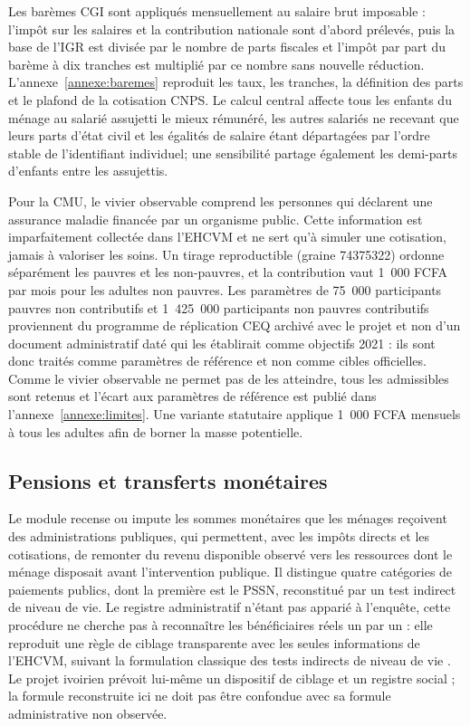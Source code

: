 \documentclass[11pt,a4paper]{article}
\begin{document}
Les barèmes CGI sont appliqués mensuellement au salaire brut imposable : l'impôt
sur les salaires et la contribution nationale sont d'abord prélevés, puis la
base de l'IGR est divisée par le nombre de parts fiscales et l'impôt par part du
barème à dix tranches est multiplié par ce nombre sans nouvelle réduction.
L'annexe~\ref{annexe:baremes} reproduit les taux, les tranches, la définition
des parts et le plafond de la cotisation CNPS. Le calcul central affecte tous
les enfants du ménage au salarié assujetti le mieux rémunéré, les autres
salariés ne recevant que leurs parts d'état civil et les égalités de salaire
étant départagées par l'ordre stable de l'identifiant individuel; une
sensibilité partage également les demi-parts d'enfants entre les assujettis.

Pour la CMU, le vivier observable comprend les personnes qui déclarent une
assurance maladie financée par un organisme public. Cette information est
imparfaitement collectée dans l'EHCVM et ne sert qu'à simuler une cotisation,
jamais à valoriser les soins. Un tirage reproductible (graine 74375322) ordonne
séparément les pauvres et les non-pauvres, et la contribution vaut 1~000 FCFA
par mois pour les adultes non pauvres. Les paramètres de 75~000 participants
pauvres non contributifs et 1~425~000 participants non pauvres contributifs
proviennent du programme de réplication CEQ archivé avec le projet et non d'un
document administratif daté qui les établirait comme objectifs 2021 : ils sont
donc traités comme paramètres de référence et non comme cibles officielles.
Comme le vivier observable ne permet pas de les atteindre, tous les admissibles
sont retenus et l'écart aux paramètres de référence est publié dans
l'annexe~\ref{annexe:limites}. Une variante statutaire applique 1~000 FCFA
mensuels à tous les adultes afin de borner la masse potentielle.

\subsection{Pensions et transferts monétaires}

Le module recense ou impute les sommes monétaires que les ménages reçoivent des
administrations publiques, qui permettent, avec les impôts directs et les
cotisations, de remonter du revenu disponible observé vers les ressources dont
le ménage disposait avant l'intervention publique. Il distingue quatre
catégories de paiements publics, dont la première est le PSSN, reconstitué par
un test indirect de niveau de vie. Le registre administratif n'étant pas apparié
à l'enquête, cette procédure ne cherche pas à reconnaître les bénéficiaires réels
un par un : elle reproduit une règle de ciblage transparente avec les seules
informations de l'EHCVM, suivant la formulation classique des tests indirects de
niveau de vie \citep{groshbaker1995,coady2004}. Le projet ivoirien prévoit lui-même un
dispositif de ciblage et un registre social \citep{worldbankpssn2015}; la formule
reconstruite ici ne doit pas être confondue avec sa formule administrative non
observée.
\end{document}
